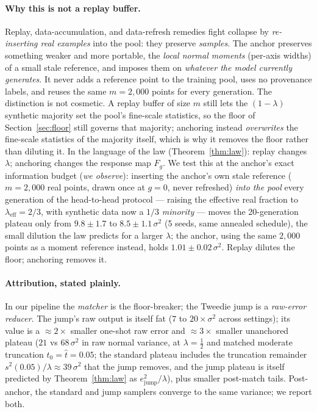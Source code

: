 \documentclass[11pt]{article}
\theoremstyle{remark}
\newcommand{\sigsq}{\sigma^2}
\begin{document}
\paragraph{Why this is not a replay buffer.} Replay, data-accumulation, and data-refresh
remedies \citep{gerstgrasser2024collapse,bertrand2024stability} fight collapse by
\emph{re-inserting real examples} into the pool: they preserve \emph{samples}. The anchor
preserves something weaker and more portable, the \emph{local normal moments} (per-axis
widths) of a small stale reference, and imposes them on \emph{whatever the model currently
generates}. It never adds a reference point to the training pool, uses no provenance labels,
and reuses the same $m{=}2{,}000$ points for every generation. The distinction is not
cosmetic. A replay buffer of size $m$ still lets the $(1-\lambda)$ synthetic majority set the
pool's fine-scale statistics, so the floor of Section~\ref{sec:floor} still governs that
majority; anchoring instead \emph{overwrites} the fine-scale statistics of the majority
itself, which is why it removes the floor rather than diluting it. In the language of the law
(Theorem~\ref{thm:law}): replay changes $\lambda$; anchoring changes the response map $F_g$.
We test this at the anchor's exact information budget (\emph{we observe}): inserting the
anchor's own stale reference ($m=2{,}000$ real points, drawn once at $g=0$, never
refreshed) \emph{into the pool} every generation of the head-to-head protocol ---
raising the effective real fraction to $\lambda_{\mathrm{eff}}=2/3$, with synthetic data
now a $1/3$ \emph{minority} --- moves the 20-generation plateau only from $9.8\pm1.7$ to
$8.5\pm1.1\,\sigsq$ (5 seeds, same annealed schedule), the small dilution the law
predicts for a larger $\lambda$; the anchor, using the same $2{,}000$ points as a moment
reference instead, holds $1.01\pm0.02\,\sigsq$. Replay dilutes the floor; anchoring
removes it.

\paragraph{Attribution, stated plainly.} In our pipeline the \emph{matcher} is the
floor-breaker; the Tweedie jump is a \emph{raw-error reducer}. The jump's raw output is
itself fat ($7$ to $20\times\sigsq$ across settings); its value is a $\approx2\times$
smaller one-shot raw error and $\approx3\times$ smaller unanchored plateau
($21$ vs $68\,\sigsq$ in raw normal variance, at $\lambda=\tfrac12$ and matched moderate
truncation $t_0=\hat t=0.05$; the standard plateau includes the truncation remainder
$s^2(0.05)/\lambda\approx39\,\sigsq$ that the jump removes, and the jump plateau is
itself predicted by Theorem~\ref{thm:law} as
$e^2_{\mathrm{jump}}/\lambda$), plus smaller post-match tails. Post-anchor, the standard
and jump samplers converge to the same variance; we report both.
\end{document}
